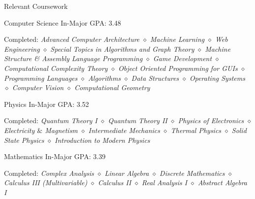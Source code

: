 \documentclass{resume}
\newcommand{\coursep}{\diamond}
\begin{document}
  \begin{rSection}{Relevant Coursework}
    \begin{rSubsection}{Computer Science}
        {In-Major GPA: 3.48}{}{}
        \item Completed: \textit{Advanced Computer Architecture $\coursep$ Machine Learning $\coursep$ Web Engineering $\coursep$ Special Topics in Algorithms and Graph Theory $\coursep$ Machine Structure \& Assembly Language Programming $\coursep$ Game Development $\coursep$ Computational Complexity Theory $\coursep$ Object Oriented Programming for GUIs $\coursep$ Programming Languages $\coursep$ Algorithms $\coursep$ Data Structures $\coursep$ Operating Systems $\coursep$ Computer Vision $\coursep$ Computational Geometry}
    \end{rSubsection}
    \begin{rSubsection}{Physics}
        {In-Major GPA: 3.52}{}{}
        \item Completed: \textit{Quantum Theory I $\coursep$ Quantum Theory II $\coursep$ Physics of Electronics $\coursep$ Electricity $\&$ Magnetism $\coursep$ Intermediate Mechanics $\coursep$ Thermal Physics $\coursep$ Solid State Physics $\coursep$ Introduction to Modern Physics}
    \end{rSubsection}
    \begin{rSubsection}{Mathematics}
        {In-Major GPA: 3.39}{}{}
        \item Completed: \textit{Complex Analysis $\coursep$ Linear Algebra $\coursep$ Discrete Mathematics $\coursep$ Calculus III (Multivariable) $\coursep$ Calculus II $\coursep$ Real Analysis I $\coursep$ Abstract Algebra I} 
    \end{rSubsection}
  \end{rSection}
\end{document}

